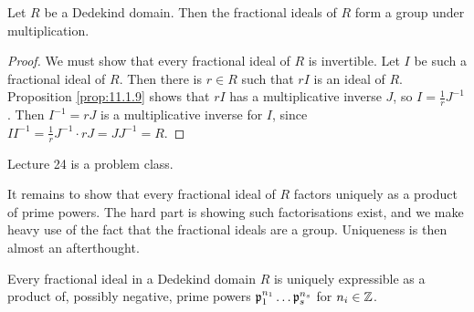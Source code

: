 \begin{theorem}
Let $ R $ be a Dedekind domain. Then the fractional ideals of $ R $ form a group under multiplication.
\end{theorem}

\begin{proof}
We must show that every fractional ideal of $ R $ is invertible. Let $ I $ be such a fractional ideal of $ R $. Then there is $ r \in R $ such that $ rI $ is an ideal of $ R $. Proposition \ref{prop:11.1.9} shows that $ rI $ has a multiplicative inverse $ J $, so $ I = \tfrac{1}{r}J^{-1} $. Then $ I^{-1} = rJ $ is a multiplicative inverse for $ I $, since $ II^{-1} = \tfrac{1}{r}J^{-1} \cdot rJ = JJ^{-1} = R $.
\end{proof}


Lecture 24 is a problem class.


It remains to show that every fractional ideal of $ R $ factors uniquely as a product of prime powers. The hard part is showing such factorisations exist, and we make heavy use of the fact that the fractional ideals are a group. Uniqueness is then almost an afterthought.

\pagebreak

\begin{proposition}
Every fractional ideal in a Dedekind domain $ R $ is uniquely expressible as a product of, possibly negative, prime powers $ \mathfrak{p}_1^{n_1} \dots \mathfrak{p}_s^{n_s} $ for $ n_i \in \mathbb{Z} $.
\end{proposition}

